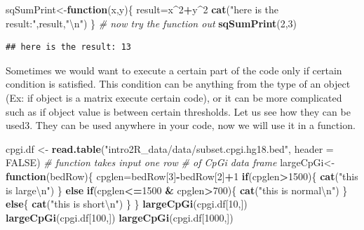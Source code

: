 \documentclass[12pt,]{krantz}
\newenvironment{Shaded}{\begin{snugshade}}{\end{snugshade}}
\newcommand{\CharTok}[1]{\textcolor[rgb]{0.31,0.60,0.02}{#1}}
\newcommand{\CommentTok}[1]{\textcolor[rgb]{0.56,0.35,0.01}{\textit{#1}}}
\newcommand{\ControlFlowTok}[1]{\textcolor[rgb]{0.13,0.29,0.53}{\textbf{#1}}}
\newcommand{\DataTypeTok}[1]{\textcolor[rgb]{0.13,0.29,0.53}{#1}}
\newcommand{\DecValTok}[1]{\textcolor[rgb]{0.00,0.00,0.81}{#1}}
\newcommand{\KeywordTok}[1]{\textcolor[rgb]{0.13,0.29,0.53}{\textbf{#1}}}
\newcommand{\NormalTok}[1]{#1}
\newcommand{\OperatorTok}[1]{\textcolor[rgb]{0.81,0.36,0.00}{\textbf{#1}}}
\newcommand{\OtherTok}[1]{\textcolor[rgb]{0.56,0.35,0.01}{#1}}
\newcommand{\StringTok}[1]{\textcolor[rgb]{0.31,0.60,0.02}{#1}}
\begin{document}
\begin{Shaded}
\begin{Highlighting}[]
\NormalTok{sqSumPrint<-}\ControlFlowTok{function}\NormalTok{(x,y)\{}
\NormalTok{result=x}\OperatorTok{^}\DecValTok{2}\OperatorTok{+}\NormalTok{y}\OperatorTok{^}\DecValTok{2}
\KeywordTok{cat}\NormalTok{(}\StringTok{"here is the result:"}\NormalTok{,result,}\StringTok{"}\CharTok{\textbackslash{}n}\StringTok{"}\NormalTok{)}
\NormalTok{\}}
\CommentTok{# now try the function out}
\KeywordTok{sqSumPrint}\NormalTok{(}\DecValTok{2}\NormalTok{,}\DecValTok{3}\NormalTok{)}
\end{Highlighting}
\end{Shaded}

\begin{verbatim}
## here is the result: 13
\end{verbatim}

Sometimes we would want to execute a certain part of the code only if certain condition is satisfied. This condition can be anything from the type of an object (Ex: if object is a matrix execute certain code), or it can be more complicated such as if object value is between certain thresholds. Let us see how they can be used3. They can be used anywhere in your code, now we will use it in a function.

\begin{Shaded}
\begin{Highlighting}[]
\NormalTok{cpgi.df <-}\StringTok{ }\KeywordTok{read.table}\NormalTok{(}\StringTok{"intro2R_data/data/subset.cpgi.hg18.bed"}\NormalTok{, }\DataTypeTok{header =} \OtherTok{FALSE}\NormalTok{)}
\CommentTok{# function takes input one row}
\CommentTok{# of CpGi data frame}
\NormalTok{largeCpGi<-}\ControlFlowTok{function}\NormalTok{(bedRow)\{}
\NormalTok{ cpglen=bedRow[}\DecValTok{3}\NormalTok{]}\OperatorTok{-}\NormalTok{bedRow[}\DecValTok{2}\NormalTok{]}\OperatorTok{+}\DecValTok{1}
 \ControlFlowTok{if}\NormalTok{(cpglen}\OperatorTok{>}\DecValTok{1500}\NormalTok{)\{}
    \KeywordTok{cat}\NormalTok{(}\StringTok{"this is large}\CharTok{\textbackslash{}n}\StringTok{"}\NormalTok{)}
\NormalTok{ \}}
 \ControlFlowTok{else} \ControlFlowTok{if}\NormalTok{(cpglen}\OperatorTok{<=}\DecValTok{1500} \OperatorTok{&}\StringTok{ }\NormalTok{cpglen}\OperatorTok{>}\DecValTok{700}\NormalTok{)\{}
    \KeywordTok{cat}\NormalTok{(}\StringTok{"this is normal}\CharTok{\textbackslash{}n}\StringTok{"}\NormalTok{)}
\NormalTok{ \}}
 \ControlFlowTok{else}\NormalTok{\{}
    \KeywordTok{cat}\NormalTok{(}\StringTok{"this is short}\CharTok{\textbackslash{}n}\StringTok{"}\NormalTok{)}
\NormalTok{ \}}
\NormalTok{\}}
\KeywordTok{largeCpGi}\NormalTok{(cpgi.df[}\DecValTok{10}\NormalTok{,])}
\KeywordTok{largeCpGi}\NormalTok{(cpgi.df[}\DecValTok{100}\NormalTok{,])}
\KeywordTok{largeCpGi}\NormalTok{(cpgi.df[}\DecValTok{1000}\NormalTok{,])}
\end{Highlighting}
\end{Shaded}
\end{document}
